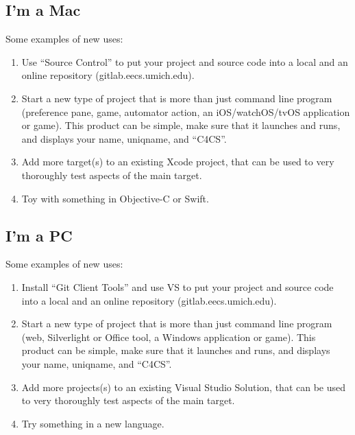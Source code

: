 \documentclass{article}
\begin{document}
\subsection{I'm a Mac}
Some examples of new uses:
\begin{enumerate}
\item Use ``Source Control'' to put your project and source code into a local
      and an online repository (gitlab.eecs.umich.edu).
\item Start a new type of project that is more than just command line program
      (preference pane, game, automator action, an iOS/watchOS/tvOS application
      or game). This product can be simple, make sure that it launches and
      runs, and displays your name, uniqname, and ``C4CS''.
\item Add more target(s) to an existing Xcode project, that can be used to very
      thoroughly test aspects of the main target.
\item Toy with something in Objective-C or Swift.
\end{enumerate}

\subsection{I'm a PC}
Some examples of new uses:
\begin{enumerate}
\item Install ``Git Client Tools'' and use VS to put your project and source
      code into a local and an online repository (gitlab.eecs.umich.edu).
\item Start a new type of project that is more than just command line program
      (web, Silverlight or Office tool, a Windows application or game). This
      product can be simple, make sure that it launches and runs, and displays
      your name, uniqname, and ``C4CS''.
\item Add more projects(s) to an existing Visual Studio Solution, that can be
      used to very thoroughly test aspects of the main target.
\item Try something in a new language.
\end{enumerate}
\end{document}
